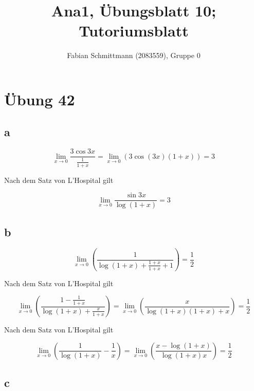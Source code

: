 \documentclass[a4paper,10pt]{article}
\title{Ana1, Übungsblatt 10; Tutoriumsblatt}
\author{Fabian Schmittmann (2083559), Gruppe 0}
\begin{document}
\maketitle

\section*{Übung 42}

\subsection*{a}

\begin{equation}
 \lim_{x \rightarrow 0} \frac{3 \cos 3x}{\frac{1}{1 + x}} = \lim_{x \rightarrow 0}(3 \cos(3x)(1 + x)) = 3
\end{equation}

Nach dem Satz von L'Hospital gilt

\begin{equation}
 \lim_{x \rightarrow 0} \frac{\sin 3x}{\log (1 + x)} = 3
\end{equation}

\subsection*{b}

\begin{equation}
 \lim_{x \rightarrow 0} \left( \frac{1}{\log(1 + x) + \frac{1 + x}{1 + x} + 1} \right) = \frac{1}{2}
\end{equation}

Nach dem Satz von L'Hospital gilt

\begin{equation}
 \lim_{x \rightarrow 0} \left( \frac{1 - \frac{1}{1 + x}}{\log(1 + x) + \frac{x}{1 + x}} \right) = \lim_{x \rightarrow 0} \left( \frac{x}{\log(1 + x)(1 + x) + x} \right) = \frac{1}{2}
\end{equation}

Nach dem Satz von L'Hospital gilt

\begin{equation}
 \lim_{x \rightarrow 0} \left( \frac{1}{\log(1 + x)} - \frac{1}{x} \right) = \lim_{x \rightarrow 0} \left( \frac{x - \log(1 + x)}{\log(1 + x)x} \right) = \frac{1}{2}
\end{equation}

\subsection*{c}
\end{document}
